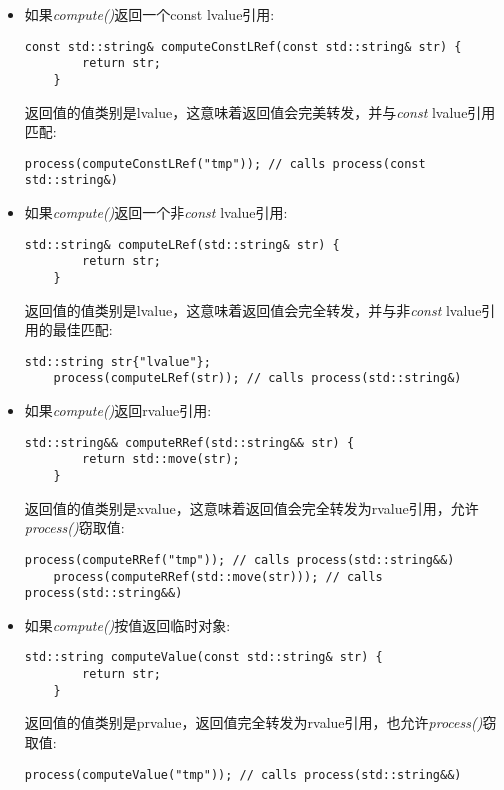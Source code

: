 \begin{itemize}
	\item 如果\textit{compute()}返回一个const lvalue引用:\par
	\begin{lstlisting}[caption={}]
	const std::string& computeConstLRef(const std::string& str) {
		return str;
	}
	\end{lstlisting}
	返回值的值类别是lvalue，这意味着返回值会完美转发，并与\textit{const} lvalue引用匹配:\par
	\begin{lstlisting}[caption={}]
	process(computeConstLRef("tmp")); // calls process(const std::string&)
	\end{lstlisting}
	\item 如果\textit{compute()}返回一个非\textit{const} lvalue引用:\par
	\begin{lstlisting}[caption={}]
	std::string& computeLRef(std::string& str) {
		return str;
	}
	\end{lstlisting}
	返回值的值类别是lvalue，这意味着返回值会完全转发，并与非\textit{const} lvalue引用的最佳匹配:\par
	\begin{lstlisting}[caption={}]
	std::string str{"lvalue"};
	process(computeLRef(str)); // calls process(std::string&)
	\end{lstlisting}
	\item 如果\textit{compute()}返回rvalue引用:\par
	\begin{lstlisting}[caption={}]
	std::string&& computeRRef(std::string&& str) {
		return std::move(str);
	}
	\end{lstlisting}
	返回值的值类别是xvalue，这意味着返回值会完全转发为rvalue引用，允许\textit{process()}窃取值:\par
	\begin{lstlisting}[caption={}]
	process(computeRRef("tmp")); // calls process(std::string&&)
	process(computeRRef(std::move(str))); // calls process(std::string&&)
	\end{lstlisting}
	\item 如果\textit{compute()}按值返回临时对象:\par
	\begin{lstlisting}[caption={}]
	std::string computeValue(const std::string& str) {
		return str;
	}
	\end{lstlisting}
	返回值的值类别是prvalue，返回值完全转发为rvalue引用，也允许\textit{process()}窃取值:\par
	\begin{lstlisting}[caption={}]
	process(computeValue("tmp")); // calls process(std::string&&)
	\end{lstlisting}
\end{itemize}

